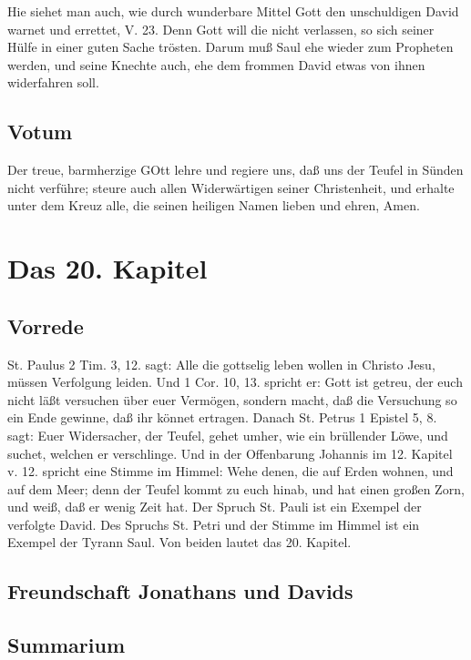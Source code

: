 Hie siehet man auch, wie durch wunderbare Mittel Gott den unschuldigen David warnet und errettet, V. 23. Denn Gott will die nicht verlassen, so sich seiner Hülfe in einer guten Sache trösten. Darum muß Saul ehe wieder zum Propheten werden, und seine Knechte auch, ehe dem frommen David etwas von ihnen widerfahren soll.

\section{Votum}

Der treue, barmherzige GOtt lehre und regiere uns, daß uns der Teufel in Sünden nicht verführe; steure auch allen Widerwärtigen seiner Christenheit, und erhalte unter dem Kreuz alle, die seinen heiligen Namen lieben und ehren, Amen.

\chapter{Das 20. Kapitel}

\section{Vorrede}

St. Paulus 2 Tim. 3, 12. sagt: Alle die gottselig leben wollen in Christo Jesu, müssen Verfolgung leiden. Und 1 Cor. 10, 13. spricht er: Gott ist getreu, der euch nicht läßt versuchen über euer Vermögen, sondern macht, daß die Versuchung so ein Ende gewinne, daß ihr könnet ertragen. Danach St. Petrus 1 Epistel 5, 8. sagt: Euer Widersacher, der Teufel, gehet umher, wie ein brüllender Löwe, und suchet, welchen er verschlinge. Und in der Offenbarung Johannis im 12. Kapitel v. 12. spricht eine Stimme im Himmel: Wehe denen, die auf Erden wohnen, und auf dem Meer; denn der Teufel kommt zu euch hinab, und hat einen großen Zorn, und weiß, daß er wenig Zeit hat. Der Spruch St. Pauli ist ein Exempel der verfolgte David. Des Spruchs St. Petri und der Stimme im Himmel ist ein Exempel der Tyrann Saul. Von beiden lautet das 20. Kapitel.

\section{Freundschaft Jonathans und Davids}

\section{Summarium}

